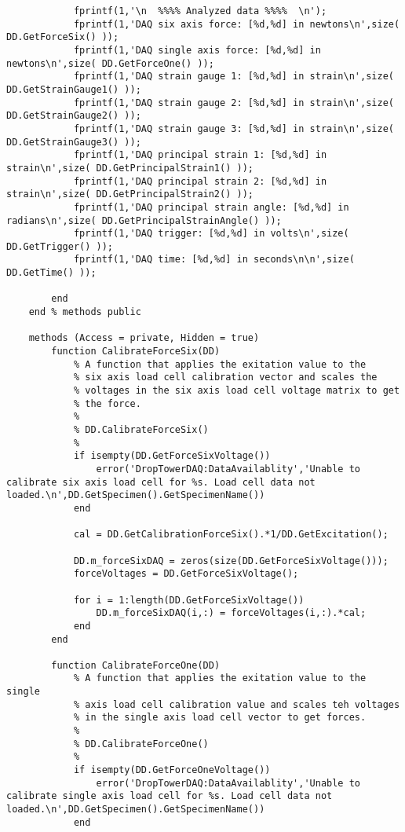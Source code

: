 \begin{lstlisting}
            fprintf(1,'\n  %%%% Analyzed data %%%%  \n');
            fprintf(1,'DAQ six axis force: [%d,%d] in newtons\n',size( DD.GetForceSix() ));
            fprintf(1,'DAQ single axis force: [%d,%d] in newtons\n',size( DD.GetForceOne() ));           
            fprintf(1,'DAQ strain gauge 1: [%d,%d] in strain\n',size( DD.GetStrainGauge1() ));
            fprintf(1,'DAQ strain gauge 2: [%d,%d] in strain\n',size( DD.GetStrainGauge2() ));
            fprintf(1,'DAQ strain gauge 3: [%d,%d] in strain\n',size( DD.GetStrainGauge3() ));
            fprintf(1,'DAQ principal strain 1: [%d,%d] in strain\n',size( DD.GetPrincipalStrain1() ));
            fprintf(1,'DAQ principal strain 2: [%d,%d] in strain\n',size( DD.GetPrincipalStrain2() ));
            fprintf(1,'DAQ principal strain angle: [%d,%d] in radians\n',size( DD.GetPrincipalStrainAngle() ));
            fprintf(1,'DAQ trigger: [%d,%d] in volts\n',size( DD.GetTrigger() ));
            fprintf(1,'DAQ time: [%d,%d] in seconds\n\n',size( DD.GetTime() ));
            
        end
    end % methods public
        
    methods (Access = private, Hidden = true)                    
        function CalibrateForceSix(DD)
            % A function that applies the exitation value to the 
            % six axis load cell calibration vector and scales the
            % voltages in the six axis load cell voltage matrix to get 
            % the force.
            %
            % DD.CalibrateForceSix()
            %
            if isempty(DD.GetForceSixVoltage())
                error('DropTowerDAQ:DataAvailablity','Unable to calibrate six axis load cell for %s. Load cell data not loaded.\n',DD.GetSpecimen().GetSpecimenName())
            end
            
            cal = DD.GetCalibrationForceSix().*1/DD.GetExcitation();
            
            DD.m_forceSixDAQ = zeros(size(DD.GetForceSixVoltage()));
            forceVoltages = DD.GetForceSixVoltage();
            
            for i = 1:length(DD.GetForceSixVoltage())
                DD.m_forceSixDAQ(i,:) = forceVoltages(i,:).*cal;
            end           
        end
        
        function CalibrateForceOne(DD)
            % A function that applies the exitation value to the single
            % axis load cell calibration value and scales teh voltages
            % in the single axis load cell vector to get forces.
            %
            % DD.CalibrateForceOne()
            %
            if isempty(DD.GetForceOneVoltage())
                error('DropTowerDAQ:DataAvailablity','Unable to calibrate single axis load cell for %s. Load cell data not loaded.\n',DD.GetSpecimen().GetSpecimenName())
            end
            

\end{lstlisting}
